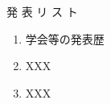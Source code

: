\chapter*{}
\thispagestyle{myheadings}

\vspace*{-2cm}
\begin{center}
{\Large 発 表 リ ス ト}
\end{center}
\vspace{1.0cm}

\begin{enumerate}
\item
学会等の発表歴

\item
XXX

\item
XXX

\end{enumerate}

